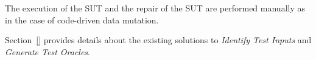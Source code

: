 The execution of the SUT and the repair of the SUT are performed manually as in the case of code-driven data mutation.

Section~\ref{} provides details about the existing solutions to  \emph{Identify Test Inputs} and \emph{Generate Test Oracles}.

%
% 
%
%

